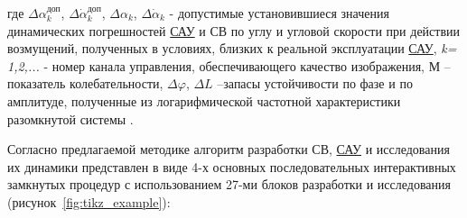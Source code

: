 где  $\varDelta \alpha^{\textit{доп}}_{k}$, 
$\varDelta \dot{\alpha}^{\textit{доп}}_{k}$, 
$\varDelta \alpha _k$, 
$\varDelta \dot{\alpha}_k$ 
- допустимые установившиеся значения динамических погрешностей \hyperref[acroSAU]{САУ} и СВ по углу  и угловой скорости  при действии возмущений, полученных в условиях, близких к реальной эксплуатации \hyperref[acroSAU]{САУ}, \textit{k= 1,2,...} - номер канала управления, обеспечивающего качество изображения, М – показатель колебательности, $\varDelta \varphi$, $\varDelta L$ –запасы устойчивости по фазе и по амплитуде, полученные из логарифмической частотной характеристики  разомкнутой системы \cite[]{Bessekerski20}.

Согласно предлагаемой методике алгоритм разработки СВ, \hyperref[acroSAU]{САУ} и исследования их динамики представлен в виде 4-х основных последовательных интерактивных замкнутых процедур с использованием 27-ми блоков разработки и исследования (рисунок~\ref{fig:tikz_example}):


